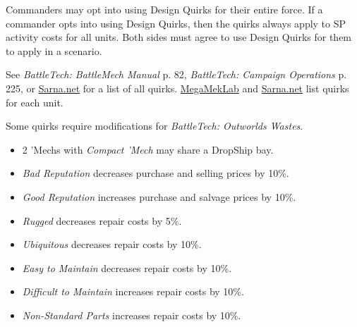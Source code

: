 Commanders may opt into using Design Quirks for their entire force.
If a commander opts into using Design Quirks, then the quirks always apply to SP activity costs for all units.
Both sides must agree to use Design Quirks for them to apply in a scenario.

See \emph{BattleTech: BattleMech Manual} p. 82, \emph{BattleTech: Campaign Operations} p. 225, or \href{https://sarna.net}{Sarna.net} for a list of all quirks.
\href{https://megamek.org}{MegaMekLab} and \href{https://sarna.net}{Sarna.net} list quirks for each unit.

Some quirks require modifications for \emph{BattleTech: Outworlds Wastes}.

\begin{itemize}

\item 2 'Mechs with \emph{Compact 'Mech} may share a DropShip bay.

\item \emph{Bad Reputation} decreases purchase and selling prices by 10\%.

\item \emph{Good Reputation} increases purchase and salvage prices by 10\%.

\item \emph{Rugged} decreases repair costs by 5\%.

\item \emph{Ubiquitous} decreases repair costs by 10\%.

\item \emph{Easy to Maintain} decreases repair costs by 10\%.

\item \emph{Difficult to Maintain} increases repair costs by 10\%.

\item \emph{Non-Standard Parts} increases repair costs by 10\%.

\end{itemize}
